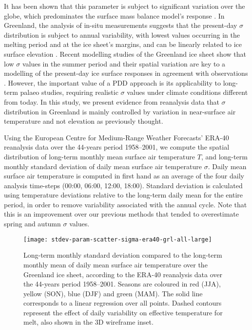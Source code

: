 \documentclass[review]{igs}
\begin{document}
It has been shown that this parameter is subject to significant variation over the globe, which predominates the surface mass balance model’s response \citep{seguinot-2013}. In Greenland, the analysis of in-situ measurements suggests that the present-day $\sigma$ distribution is subject to annual variability, with lowest values occurring in the melting period and at the ice sheet's margins, and can be linearly related to ice surface elevation \citep{fausto-etal-2009,fausto-etal-2011}. Recent modelling studies of the Greenland ice sheet show that low $\sigma$ values in the summer period and their spatial variation are key to a modelling of the present-day ice surface responses in agreement with observations \citep{rogozhina-rau-inpress}. However, the important value of a PDD approach is its applicability to long-term palaeo studies, requiring realistic $\sigma$ values under climate conditions different from today. In this study, we present evidence from reanalysis data that $\sigma$ distribution in Greenland is mainly controlled by variation in near-surface air temperature and not elevation as previously thought.

Using the European Centre for Medium-Range Weather Forecasts’ ERA-40 reanalysis data \citep{uppala-etal-2005} over the 44-years period 1958–2001, we compute the spatial distribution of long-term monthly mean surface air temperature $T$, and long-term monthly standard deviation of daily mean surface air temperature $\sigma$. Daily mean surface air temperature is computed in first hand as an average of the four daily analysis time-steps (00:00, 06:00, 12:00, 18:00). Standard deviation is calculated using temperature deviations relative to the long-term daily mean for the entire period, in order to remove variability associated with the annual cycle. Note that this is an improvement over our previous methods \citep{seguinot-2013,rogozhina-rau-inpress} that tended to overestimate spring and autumn $\sigma$ values.

\begin{figure*}
    \centering\texttt{[image: stdev-param-scatter-sigma-era40-grl-all-large]}
    \caption{Long-term monthly standard deviation compared to the long-term monthly mean of daily mean surface air temperature over the Greenland ice sheet, according to the ERA-40 reanalysis data \citep{uppala-etal-2005} over the 44-years period 1958–2001. Seasons are coloured in red (JJA), yellow (SON), blue (DJF) and green (MAM). The solid line corresponds to a linear regression over all points. Dashed contours represent the effect of daily variability on effective temperature for melt, also shown in the 3D wireframe inset.}
    \label{fig:grl}
\end{figure*}
\end{document}

